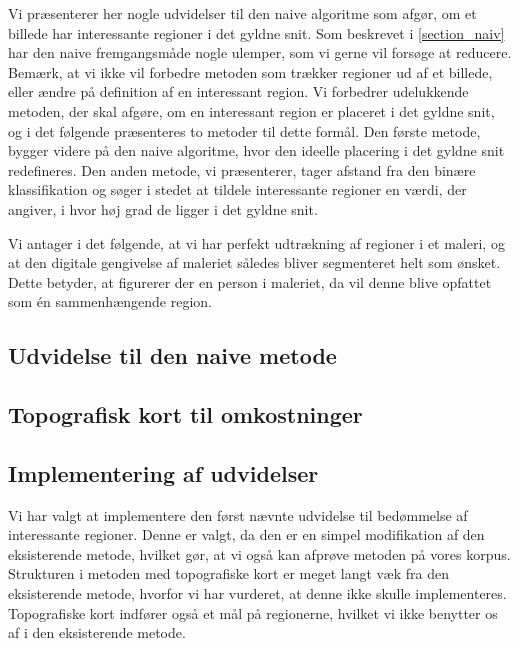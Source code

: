 {
{\sffamily Vi præsenterer her nogle udvidelser til den naive algoritme
som afgør, om et billede har interessante regioner i det gyldne snit.
Som beskrevet i \ref{section_naiv} har den naive fremgangsmåde nogle
ulemper, som vi gerne vil forsøge at reducere. Bemærk, at vi ikke vil
forbedre metoden som trækker regioner ud af et billede, eller ændre på
definition af en interessant region. Vi forbedrer udelukkende metoden,
der skal afgøre, om en interessant region er placeret i det gyldne snit,
og i det følgende præsenteres to metoder til dette formål. Den første
metode, bygger videre på den naive algoritme, hvor den ideelle placering
i det gyldne snit redefineres. Den anden metode, vi præsenterer, tager
afstand fra den binære klassifikation og søger i stedet at tildele
interessante regioner en værdi, der angiver, i hvor høj grad de ligger i
det gyldne snit.

Vi antager i det følgende, at vi har perfekt udtrækning af regioner i et
maleri, og at den digitale gengivelse af maleriet således bliver
segmenteret helt som ønsket. Dette betyder, at figurerer der en person i
maleriet, da vil denne blive opfattet som én sammenhængende region.
}

\subsection{Udvidelse til den naive metode}


\subsection{Topografisk kort til omkostninger}


\subsection{Implementering af udvidelser}
Vi har valgt at implementere den først nævnte udvidelse til bedømmelse
af interessante regioner. Denne er valgt, da den er en simpel
modifikation af den eksisterende metode, hvilket gør, at vi også kan
afprøve metoden på vores korpus. Strukturen i metoden med topografiske
kort er meget langt væk fra den eksisterende metode, hvorfor vi har
vurderet, at denne ikke skulle implementeres. Topografiske kort indfører
også et mål på regionerne, hvilket vi ikke benytter os af i den
eksisterende metode.

}


